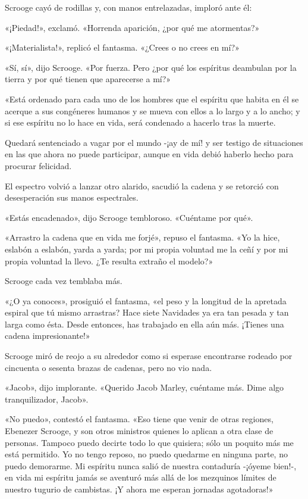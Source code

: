 \documentclass{novela}
\begin{document}
 Scrooge cayó de rodillas y, con manos entrelazadas, imploró ante él:

 «¡Piedad!», exclamó. «Horrenda aparición, ¿por qué me atormentas?»

 «¡Materialista!», replicó el fantasma. «¿Crees o no crees en mí?»

 «Sí, sí», dijo Scrooge. «Por fuerza. Pero ¿por qué los espíritus deambulan por la tierra y por qué tienen que aparecerse a mí?»

 «Está ordenado para cada uno de los hombres que el espíritu que habita en él se acerque a sus congéneres humanos y se mueva con ellos a lo largo y a lo ancho; y si ese espíritu no lo hace en vida, será condenado a hacerlo tras la muerte.

 Quedará sentenciado a vagar por el mundo -¡ay de mí! y ser testigo de situaciones en las que ahora no puede participar, aunque en vida debió haberlo hecho para procurar felicidad.

 El espectro volvió a lanzar otro alarido, sacudió la cadena y se retorció con desesperación sus manos espectrales.

 «Estás encadenado», dijo Scrooge tembloroso. «Cuéntame por qué».

 «Arrastro la cadena que en vida me forjé», repuso el fantasma. «Yo la hice, eslabón a eslabón, yarda a yarda; por mi propia voluntad me la ceñí y por mi propia voluntad la llevo. ¿Te resulta extraño el modelo?»

 Scrooge cada vez temblaba más.

 «¿O ya conoces», prosiguió el fantasma, «el peso y la longitud de la apretada espiral que tú mismo arrastras? Hace siete Navidades ya era tan pesada y tan larga como ésta. Desde entonces, has trabajado en ella aún más. ¡Tienes una cadena impresionante!»

 Scrooge miró de reojo a su alrededor como si esperase encontrarse rodeado por cincuenta o sesenta brazas de cadenas, pero no vio nada.

 «Jacob», dijo implorante. «Querido Jacob Marley, cuéntame más. Dime algo tranquilizador, Jacob».

 «No puedo», contestó el fantasma. «Eso tiene que venir de otras regiones, Ebenezer Scrooge, y son otros ministros quienes lo aplican a otra clase de personas. Tampoco puedo decirte todo lo que quisiera; sólo un poquito más me está permitido. Yo no tengo reposo, no puedo quedarme en ninguna parte, no puedo demorarme. Mi espíritu nunca salió de nuestra contaduría -¡óyeme bien!-, en vida mi espíritu jamás se aventuró más allá de los mezquinos límites de nuestro tugurio de cambistas. ¡Y ahora me esperan jornadas agotadoras!»
\end{document}
